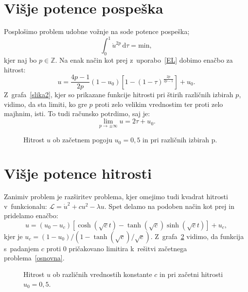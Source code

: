 \documentclass[a4paper,pdftex,12pt]{article} %
\numberwithin{equation}{section} %
\numberwithin{figure}{section} %
\numberwithin{table}{section} %
\begin{document}

\section{Višje potence pospeška}
Posplošimo problem udobne vožnje na sode potence pospeška;
\begin{equation} 
    \int_0^1 \! \dot u^{2p} \, \mathrm{d}\tau = \mathrm{min},
\end{equation}
kjer naj bo $p \in \mathds{Z} $.
Na enak način kot prej z~uporabo~\ref{EL} dobimo enačbo za hitrost:
\begin{equation}
    u = \frac{4p-1}{2p} \left( 1-u_0 \right) \left[ 1 - \left( 1- \tau 
    \right)^{\frac{2p}{2p-1}} \right] + u_0.
\end{equation}
Z~grafa~\ref{slika2}, kjer so prikazane funkcije hitrosti pri štirih različnih izbirah $p$,
vidimo, da sta limiti, ko gre $p$ proti zelo velikim vrednostim ter proti zelo majhnim,
isti. To tudi računsko potrdimo, saj je: $$ \lim_{p \to \pm \infty}\! u = 2 \tau + u_0.$$
\begin{figure}    
    
    \caption{Hitrost $u$ ob začetnem pogoju $u_0 = 0,5$ in pri različnih izbirah p.}
    \label{slika3}
\end{figure}


\section{Višje potence hitrosti}
Zanimiv problem je razširitev problema, kjer omejimo tudi kvadrat hitrosti v~funkcionalu:
$\mathcal{L} = \dot u^2 + c u^2 - \lambda u$. Spet delamo na podoben način kot prej in
pridelamo enačbo:
\begin{equation}
    u = (u_0-u_c) \left[ \operatorname{cosh}(\sqrt{c}t) -\operatorname{tanh} (\sqrt{c})
    \operatorname{sinh}(\sqrt{c}t) \right] + u_c ,
\end{equation}
kjer je $u_c = (1-u_0) / (1 - \operatorname{tanh}(\sqrt{c})/\sqrt{c})$. Z~grafa~\ref{slika4}
vidimo, da funkcija s~padanjem $c$ proti $0$ pričakovano limitira k~rešitvi začetnega
problema~\ref{osnovna}.
\begin{figure}    
    
    \caption{Hitrost $u$ ob različnih vrednostih konstante $c$ in pri začetni hitrosti
    $u_0=0,5$.}
    \label{slika4}
\end{figure}
\end{document}
